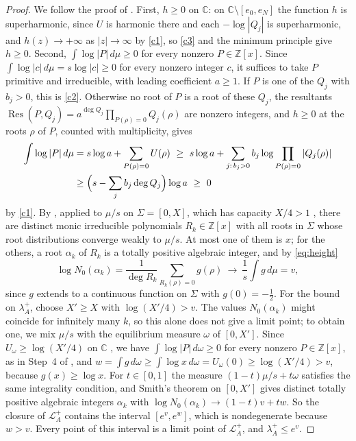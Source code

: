 \documentclass[11pt]{amsart}
\theoremstyle{remark}
\numberwithin{equation}{section}
\newcommand{\Z}{\mathbb{Z}}
\newcommand{\C}{\mathbb{C}}
\newcommand{\Res}{\operatorname{Res}}
\begin{document}
\begin{proof}
We follow the proof of \cite[Lemma~2.1]{Tom26b}. First, $h\ge0$ on $\C$: on $\C\setminus[e_0,e_N]$ the function $h$ is superharmonic, since $U$ is harmonic there and each $-\log|Q_j|$ is superharmonic, and $h(z)\to+\infty$ as $|z|\to\infty$ by \ref{c1}, so \ref{c3} and the minimum principle give $h\ge0$. Second, $\int\log|P|\,d\mu\ge0$ for every nonzero $P\in\Z[x]$. Since $\int\log|c|\,d\mu=s\log|c|\ge0$ for every nonzero integer $c$, it suffices to take $P$ primitive and irreducible, with leading coefficient $a\ge1$. If $P$ is one of the $Q_j$ with $b_j>0$, this is \ref{c2}. Otherwise no root of $P$ is a root of these $Q_j$, the resultants $\Res(P,Q_j)=a^{\deg Q_j}\prod_{P(\rho)=0}Q_j(\rho)$ are nonzero integers, and $h\ge0$ at the roots $\rho$ of $P$, counted with multiplicity, gives
\begin{align*}
\int\log|P|\,d\mu&=s\log a+\sum_{P(\rho)=0}U(\rho)\ \ge\ s\log a+\sum_{j:\,b_j>0}b_j\log\prod_{P(\rho)=0}|Q_j(\rho)|\\
&\ge\Bigl(s-\sum_jb_j\deg Q_j\Bigr)\log a\ \ge\ 0
\end{align*}
by \ref{c1}. By \cite[Theorem~1.5]{Smi24}, applied to $\mu/s$ on $\Sigma=[0,X]$, which has capacity $X/4>1$ \cite[Example~I.3.5]{ST97}, there are distinct monic irreducible polynomials $R_k\in\Z[x]$ with all roots in $\Sigma$ whose root distributions converge weakly to $\mu/s$. At most one of them is $x$; for the others, a root $\alpha_k$ of $R_k$ is a totally positive algebraic integer, and by \eqref{eq:height}
\[
\log N_0(\alpha_k)=\frac1{\deg R_k}\sum_{R_k(\rho)=0}g(\rho)\ \longrightarrow\ \frac1s\int g\,d\mu=v,
\]
since $g$ extends to a continuous function on $\Sigma$ with $g(0)=-\frac12$. For the bound on $\lambda_A^+$, choose $X'\ge X$ with $\log(X'/4)>v$. The values $N_0(\alpha_k)$ might coincide for infinitely many $k$, so this alone does not give a limit point; to obtain one, we mix $\mu/s$ with the equilibrium measure $\omega$ of $[0,X']$. Since $U_\omega\ge\log(X'/4)$ on $\C$ \cite[(I.1.4) and Example~I.3.5]{ST97}, we have $\int\log|P|\,d\omega\ge0$ for every nonzero $P\in\Z[x]$, as in Step~4 of \cite[Lemma~2.1]{Tom26b}, and $w=\int g\,d\omega\ge\int\log x\,d\omega=U_\omega(0)\ge\log(X'/4)>v$, because $g(x)\ge\log x$. For $t\in[0,1]$ the measure $(1-t)\mu/s+t\omega$ satisfies the same integrality condition, and Smith's theorem on $[0,X']$ gives distinct totally positive algebraic integers $\alpha_k$ with $\log N_0(\alpha_k)\to(1-t)v+tw$. So the closure of $\mathcal L_A^+$ contains the interval $[e^v,e^w]$, which is nondegenerate because $w>v$. Every point of this interval is a limit point of $\mathcal L_A^+$, and $\lambda_A^+\le e^v$.
\end{proof}
\end{document}
